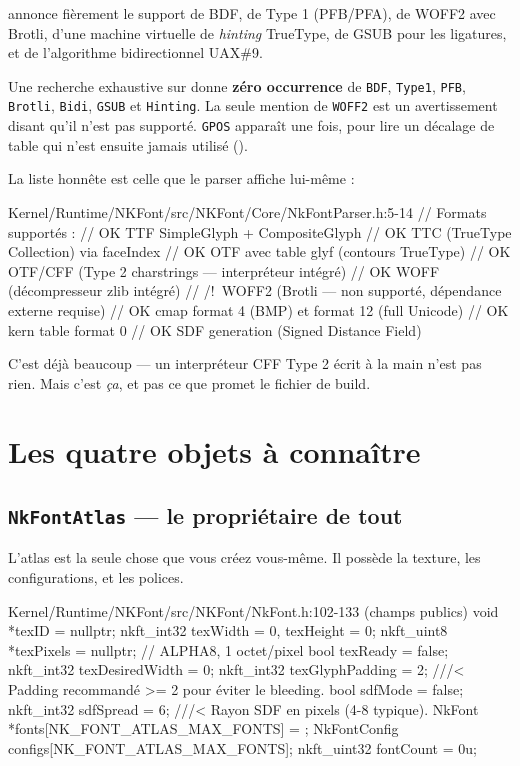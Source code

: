 \begin{nkpiege}
 annonce fièrement le support de
BDF, de Type 1 (PFB/PFA), de WOFF2 avec Brotli, d'une machine virtuelle de
\emph{hinting} TrueType, de GSUB pour les ligatures, et de l'algorithme
bidirectionnel UAX\#9.

Une recherche exhaustive sur  donne \textbf{zéro occurrence} de
\texttt{BDF}, \texttt{Type1}, \texttt{PFB}, \texttt{Brotli}, \texttt{Bidi},
\texttt{GSUB} et \texttt{Hinting}. La seule mention de \texttt{WOFF2} est un
avertissement disant qu'il n'est pas supporté. \texttt{GPOS} apparaît une fois,
pour lire un décalage de table qui n'est ensuite jamais utilisé
().

La liste honnête est celle que le parser affiche lui-même :

\begin{nkcode}{Kernel/Runtime/NKFont/src/NKFont/Core/NkFontParser.h:5-14}
// Formats supportés :
//   OK  TTF SimpleGlyph + CompositeGlyph
//   OK  TTC (TrueType Collection) via faceIndex
//   OK  OTF avec table glyf (contours TrueType)
//   OK  OTF/CFF (Type 2 charstrings — interpréteur intégré)
//   OK  WOFF (décompresseur zlib intégré)
//   /!\ WOFF2 (Brotli — non supporté, dépendance externe requise)
//   OK  cmap format 4 (BMP) et format 12 (full Unicode)
//   OK  kern table format 0
//   OK  SDF generation (Signed Distance Field)
\end{nkcode}

C'est déjà beaucoup — un interpréteur CFF Type 2 écrit à la main n'est pas rien.
Mais c'est \emph{ça}, et pas ce que promet le fichier de build.
\end{nkpiege}

\section{Les quatre objets à connaître}

\subsection{\texttt{NkFontAtlas} — le propriétaire de tout}

L'atlas est la seule chose que vous créez vous-même. Il possède la texture, les
configurations, et les polices.

\begin{nkcode}{Kernel/Runtime/NKFont/src/NKFont/NkFont.h:102-133 (champs publics)}
            void *texID = nullptr;
            nkft_int32 texWidth = 0, texHeight = 0;
            nkft_uint8 *texPixels = nullptr;      // ALPHA8, 1 octet/pixel
            bool texReady = false;
            nkft_int32 texDesiredWidth = 0;
            nkft_int32 texGlyphPadding = 2;       ///< Padding recommandé >= 2 pour éviter le bleeding.
            bool sdfMode = false;
            nkft_int32 sdfSpread = 6;             ///< Rayon SDF en pixels (4-8 typique).
            NkFont *fonts[NK_FONT_ATLAS_MAX_FONTS] = {};
            NkFontConfig configs[NK_FONT_ATLAS_MAX_FONTS];
            nkft_uint32 fontCount = 0u;
\end{nkcode}

